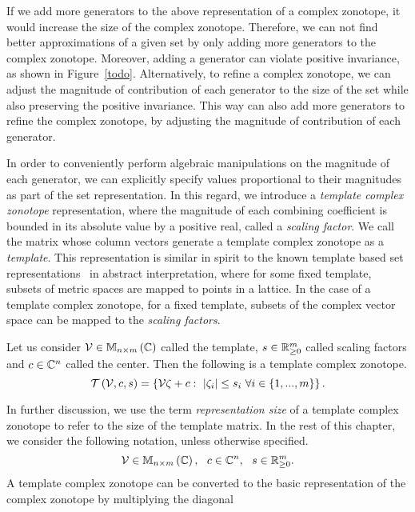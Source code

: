 If we add more generators to the above representation of a complex
zonotope, it would increase the size of the complex zonotope.
Therefore, we can not find better approximations of a given set by
only adding more generators to the complex zonotope.  Moreover, adding a
generator can violate positive invariance, as shown in
Figure~\ref{todo}.  Alternatively, to refine a complex zonotope, we
can adjust the magnitude of contribution of each generator to the size
of the set while also preserving the positive
invariance.  This way can also add more generators to refine the
complex zonotope, by adjusting the
magnitude of contribution of each generator.

In order to conveniently perform algebraic manipulations on the
magnitude of each generator, we can explicitly specify values
proportional to their magnitudes as part of the set representation.
In this regard, we introduce a {\it template complex zonotope}
representation, where the magnitude of each combining coefficient is
bounded in its absolute value by a positive real, called a {\it
  scaling factor}.  We call the matrix whose column vectors generate a
template complex zonotope as a {\it template}.  This representation is
similar in spirit to the known template based set
representations~\cite{todo} in abstract interpretation, where for some
fixed template, subsets
of metric spaces are mapped to points in a lattice.  In the case of a
template complex zonotope, for a fixed template, subsets of the
complex vector space can be mapped to the {\it scaling factors}.
%
\begin{definition}
Let us consider ${\mathcal{V}\in\mathbb{M}_{n\times m}\left(\mathbb{C}\right)}$ called the template,
${s\in\mathbb{R}^m_{\geq 0}}$ called scaling factors and
${c\in\mathbb{C}^n}$ called the center.  Then the following is a template
complex zonotope.
%
\begin{equation}
\mathit{\operatorname{\mathcal{T}}}\left(\mathcal{V},c,s\right)
= \left\{\mathcal{V}\zeta+c:~\left|\zeta_i\right|\leq s_i~\forall
i\in\left\{1,...,m\right\}\right\}.
\end{equation}
\end{definition}
In further discussion, we use the term {\it representation size} of a
template complex zonotope to refer to the size of the template matrix.
In the rest of this chapter, we consider the following notation,
unless otherwise specified.
%
\[
\mathcal{V}\in\mathbb{M}_{n\times m}\left(\mathbb{C}\right),~~c\in\mathbb{C}^n,~~s\in\mathbb{R}^m_{\geq 0}.
\]
%
A template complex zonotope can be converted to the basic
representation of the complex zonotope by multiplying the diagonal
